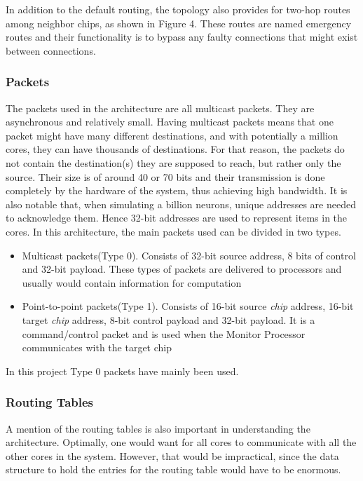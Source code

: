 \documentclass[12pt,a4paper]{article}
\begin{document}
In addition to the default routing, the topology also provides for two-hop routes among neighbor chips, as shown in Figure 4. These routes are named emergency routes and their functionality is to bypass any faulty connections that might exist between connections\cite{navaridas2009understanding}\cite{plana2007gals}.

\subsubsection{Packets}
The packets used in the architecture are all multicast packets. They are asynchronous and relatively small. Having multicast packets means that one packet might have many different destinations, and with potentially a million cores, they can have thousands of destinations. For that reason, the packets do not contain the destination(s) they are supposed to reach, but rather only the source. Their size is of around 40 or 70 bits and their transmission is done completely by the hardware of the system, thus achieving high bandwidth\cite{spinnweb}\cite{navaridas2009understanding}. It is also notable that, when simulating a billion neurons, unique addresses are needed to acknowledge them. Hence 32-bit addresses are used to represent items in the cores. In this architecture, the main packets used can be divided in two types.
\begin{itemize}
\item Multicast packets(Type 0). Consists of 32-bit source address, 8 bits of control and 32-bit payload. These types of packets are delivered to processors and usually would contain information for computation
\item Point-to-point packets(Type 1). Consists of 16-bit source \emph{chip} address, 16-bit target \emph{chip} address, 8-bit control payload and 32-bit payload. It is a command/control packet and is used when the Monitor Processor communicates with the target chip\cite{docfile}
\end{itemize}

In this project Type 0 packets have mainly been used.
\subsubsection{Routing Tables}
A mention of the routing tables is also important in understanding the architecture. Optimally, one would want for all cores to communicate with all the other cores in the system. However, that would be impractical, since the data structure to hold the entries for the routing table would have to be enormous.
\end{document}
